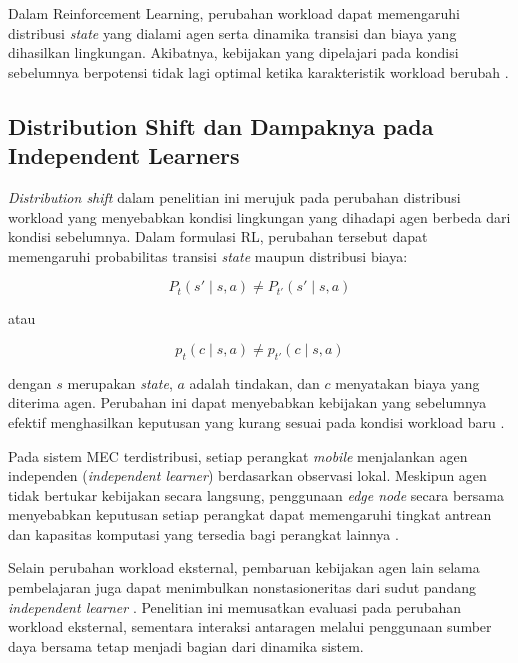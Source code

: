 Dalam Reinforcement Learning, perubahan workload dapat memengaruhi distribusi \textit{state} yang dialami agen serta dinamika transisi dan biaya yang dihasilkan lingkungan. Akibatnya, kebijakan yang dipelajari pada kondisi sebelumnya berpotensi tidak lagi optimal ketika karakteristik workload berubah \cite{padakandla2020reinforcement}.

\vspace{1cm}
\subsection{Distribution Shift dan Dampaknya pada Independent Learners}
\label{subsec:distribution_shift}

\textit{Distribution shift} dalam penelitian ini merujuk pada perubahan distribusi workload yang menyebabkan kondisi lingkungan yang dihadapi agen berbeda dari kondisi sebelumnya. Dalam formulasi RL, perubahan tersebut dapat memengaruhi probabilitas transisi \textit{state} maupun distribusi biaya:

\begin{equation}
\label{eq:perubahan_transisi_state}
P_t(s'\mid s,a)\neq P_{t'}(s'\mid s,a)
\end{equation}

atau

\begin{equation}
\label{eq:perubahan_distribusi_biaya}
p_t(c\mid s,a)\neq p_{t'}(c\mid s,a)
\end{equation}

dengan $s$ merupakan \textit{state}, $a$ adalah tindakan, dan $c$ menyatakan biaya yang diterima agen. Perubahan ini dapat menyebabkan kebijakan yang sebelumnya efektif menghasilkan keputusan yang kurang sesuai pada kondisi workload baru \cite{padakandla2020reinforcement}.

Pada sistem MEC terdistribusi, setiap perangkat \textit{mobile} menjalankan agen independen (\textit{independent learner}) berdasarkan observasi lokal. Meskipun agen tidak bertukar kebijakan secara langsung, penggunaan \textit{edge node} secara bersama menyebabkan keputusan setiap perangkat dapat memengaruhi tingkat antrean dan kapasitas komputasi yang tersedia bagi perangkat lainnya \cite{tang2022deep}.

Selain perubahan workload eksternal, pembaruan kebijakan agen lain selama pembelajaran juga dapat menimbulkan nonstasioneritas dari sudut pandang \textit{independent learner} \cite{papoudakis2019dealing}. Penelitian ini memusatkan evaluasi pada perubahan workload eksternal, sementara interaksi antaragen melalui penggunaan sumber daya bersama tetap menjadi bagian dari dinamika sistem.

